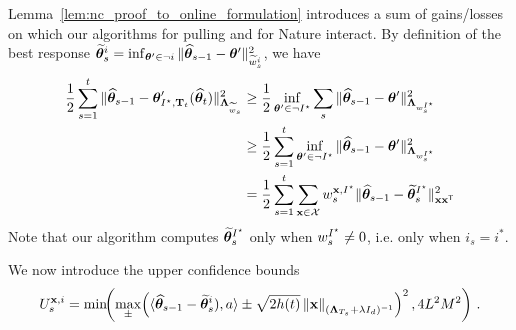 Lemma~\ref{lem:nc_proof_to_online_formulation} introduces a sum of gains/losses on which our algorithms for pulling and for Nature interact.
By definition of the best response $\widetilde{{\boldsymbol \theta}}_s^i = \inf_{{\boldsymbol \theta}' \in \neg i} \Vert \widehat{{\boldsymbol \theta}}_{s-1} - {\boldsymbol \theta}' \Vert_{\widetilde{w}_s^i}^2$, we have
\begin{align}
\frac{1}{2}\sum_{s=1}^t  \Vert \widehat{{\boldsymbol \theta}}_{s-1} - {\boldsymbol \theta}'_{I^\star,{\bf T}_t}(\widehat{{\boldsymbol \theta}}_t)\Vert_{{\boldsymbol \Lambda}_{\widetilde{w}_s}}^2
&\ge \frac{1}{2} \inf_{{\boldsymbol \theta}' \in \neg I^\star} \sum_s \Vert \widehat{{\boldsymbol \theta}}_{s-1} - {\boldsymbol \theta}'\Vert_{{\boldsymbol \Lambda}_{w_s^{I^\star}}}^2
\nonumber\\
&\geq \frac{1}{2}\sum_{s=1}^t \inf_{{\boldsymbol \theta}' \in \neg I^\star} \Vert \widehat{{\boldsymbol \theta}}_{s-1} - {\boldsymbol \theta}'\Vert_{{\boldsymbol \Lambda}_{w_s^{I^\star}}}^2
\nonumber\\
&= \frac{1}{2}\sum_{s=1}^t \sum_{{\bf x}\in\mathcal{X}} w_s^{{\bf x},I^\star}\Vert \widehat{{\boldsymbol \theta}}_{s-1} - \widetilde{{\boldsymbol \theta}}_s^{I^\star}\Vert_{{\bf x}{\bf x}^\mathsf{\scriptscriptstyle T}}^2\label{eq:only_istar}
\end{align}
Note that our algorithm computes $\widetilde{{\boldsymbol \theta}}_s^{I^\star}$ only when $w_s^{I^\star} \neq 0$, i.e. only when $i_s = i^*$.

We now introduce the upper confidence bounds
\[
    U_s^{{\bf x},i} = \min\!\!\left(\max_\pm\! \left( \langle \widehat{{\boldsymbol \theta}}_{s-1} - \widetilde{{\boldsymbol \theta}}^{i}_s), a\rangle \pm \sqrt{2 h(t)} \left\lVert{\bf x}\right\rVert_{({\boldsymbol \Lambda}_{T_s}+\lambda I_d)^{-1} } \right)^2,4L^2M^2\right)\,.
\]

